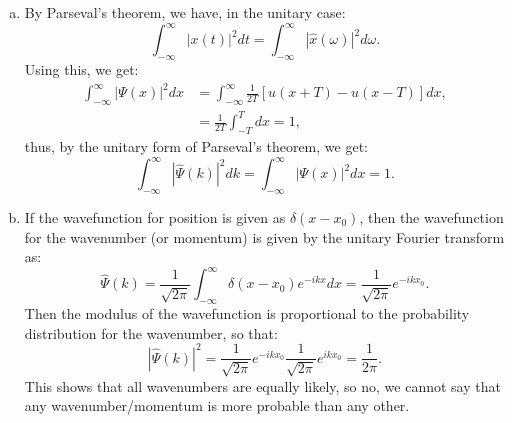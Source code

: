 \begin{enumerate}
\begin{enumerate}[a)]
          \item By Parseval's theorem, we have, in the unitary case:
                \[ \int_{-\infty}^{\infty} |x(t)|^{2}dt=\int_{-\infty}^{\infty}|\hat{x}(\omega)|^{2}d\omega. \]
                Using this, we get:
                \begin{align*}
                  \int_{-\infty}^{\infty}|\Psi(x)|^{2}dx & =\int_{-\infty}^{\infty}\frac{1}{2T}[u(x + T) - u(x - T)]dx, \\
                                                         & = \frac{1}{2T}\int_{-T}^{T}dx=1,
                \end{align*}
                thus, by the unitary form of Parseval's theorem, we get:
                \[ \int_{-\infty}^{\infty}|\hat{\Psi}(k)|^{2}dk=\int_{-\infty}^{\infty}|\Psi(x)|^{2}dx=1. \]

          \item If the wavefunction for position is given as $\delta(x - x_0)$, then the wavefunction for the wavenumber (or momentum)
                is given by the unitary Fourier transform as:
                \[ \hat{\Psi}(k) = \frac{1}{\sqrt{2\pi}}\int_{-\infty}^{\infty}\delta(x - x_0)e^{-ik x}dx=\frac{1}{\sqrt{2\pi}}e^{-ikx_{0}}. \]
                Then the modulus of the wavefunction is proportional to the probability distribution for the wavenumber, so that:
                \[ |\hat{\Psi}(k)|^{2}=\frac{1}{\sqrt{2\pi}}e^{-ikx_0}\frac{1}{\sqrt{2\pi}}e^{ikx_0}=\frac{1}{2\pi}. \]
                This shows that all wavenumbers are equally likely, so no, we cannot say that 
                any wavenumber/momentum is more probable than any other.

        \end{enumerate}
\end{enumerate}